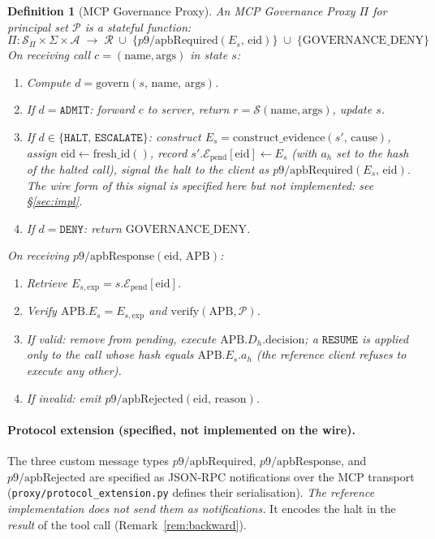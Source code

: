 \documentclass[11pt]{article}
\newtheorem{definition}{Definition}[section]
\newcommand{\HALT}{\texttt{HALT}}
\newcommand{\RESUME}{\texttt{RESUME}}
\newcommand{\DENY}{\texttt{DENY}}
\newcommand{\ADMIT}{\texttt{ADMIT}}
\newcommand{\Pset}{\mathcal{P}}
\newcommand{\Es}{E_s}
\newcommand{\ahash}{a_h}   %
\newcommand{\Dh}{D_h}
\newcommand{\APB}{\mathrm{APB}}
\newcommand{\Proxy}{\Pi}
\newcommand{\ProxyState}{\mathcal{S}_\Proxy}
\begin{document}
\begin{definition}[MCP Governance Proxy]
\label{def:proxy}
An \emph{MCP Governance Proxy} $\Proxy$ for principal set $\Pset$ is
a stateful function:
\[
  \Proxy: \ProxyState \times \Sigma \times \mathcal{A}
        \;\to\;
        \mathcal{R} \;\cup\; \{p9/\mathrm{apbRequired}(\Es,\,\text{eid})\}
                   \;\cup\; \{\mathrm{GOVERNANCE\_DENY}\}
\]
On receiving call $c = (\text{name}, \text{args})$ in state $s$:
\begin{enumerate}[leftmargin=2em, topsep=2pt, itemsep=1pt]
  \item Compute $d = \mathrm{govern}(s,\,\text{name},\,\text{args})$.
  \item If $d = \ADMIT$: forward $c$ to server, return
        $r = \mathcal{S}(\text{name}, \text{args})$,
        update $s$.
  \item If $d \in \{\HALT,\,\texttt{ESCALATE}\}$: construct
        $\Es = \mathrm{construct\_evidence}(s',\,\text{cause})$,
        assign $\text{eid} \gets \mathrm{fresh\_id}()$,
        record $s'.\mathcal{E}_\text{pend}[\text{eid}] \gets \Es$
        (with $\ahash$ set to the hash of the halted call),
        signal the halt to the client as $p9/\mathrm{apbRequired}(\Es,\,\text{eid})$.
        \emph{The wire form of this signal is specified here but not
        implemented}: see \S\ref{sec:impl}.
  \item If $d = \DENY$: return $\mathrm{GOVERNANCE\_DENY}$.
\end{enumerate}
On receiving $p9/\mathrm{apbResponse}(\text{eid},\,\APB)$:
\begin{enumerate}[leftmargin=2em, topsep=2pt, itemsep=1pt]
  \item Retrieve $E_{s,\mathrm{exp}} = s.\mathcal{E}_\text{pend}[\text{eid}]$.
  \item Verify $\APB.\Es = E_{s,\mathrm{exp}}$ and $\mathrm{verify}(\APB, \Pset)$.
  \item If valid: remove from pending, execute $\APB.\Dh.\text{decision}$;
        a $\RESUME$ is applied only to the call whose hash equals
        $\APB.\Es.\ahash$ (the reference client refuses to execute any other).
  \item If invalid: emit $p9/\mathrm{apbRejected}(\text{eid},\,\text{reason})$.
\end{enumerate}
\end{definition}

\paragraph{Protocol extension (specified, not implemented on the wire).}
The three custom message types $p9/\mathrm{apbRequired}$,
$p9/\mathrm{apbResponse}$, and $p9/\mathrm{apbRejected}$ are specified
as JSON-RPC notifications over the MCP transport
(\texttt{proxy/protocol\_extension.py} defines their serialisation).
\emph{The reference implementation does not send them as notifications.}
It encodes the halt in the \emph{result} of the tool call
(Remark~\ref{rem:backward}).
\end{document}
